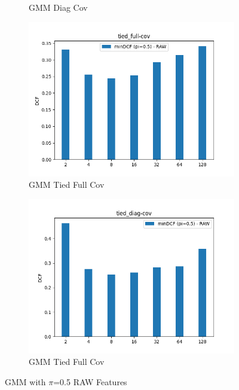 \documentclass[english]{report}
\begin{document}
\begin{figure}[h!]
\begin{subfigure}{0.4\textwidth}
        \caption{GMM Diag Cov}
    \end{subfigure}
    \begin{subfigure}{0.4\textwidth}
        \includegraphics[scale=0.4]{../../images/validation/GMM_tied-full-cov_component_comparison}
        \caption{GMM Tied Full Cov}
    \end{subfigure}
    \begin{subfigure}{0.4\textwidth}
        \includegraphics[scale=0.4]{../../images/validation/GMM_tied-diag-cov_component_comparison}
        \caption{GMM Tied Full Cov}
    \end{subfigure}
    \centering
    \caption{GMM with $\pi$=0.5 RAW Features}
    \label{fig:GMM_valid}
\end{figure}
\end{document}
